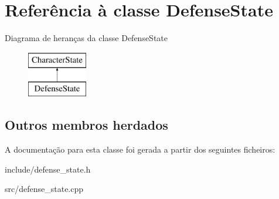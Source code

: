 \hypertarget{classDefenseState}{}\section{Referência à classe Defense\+State}
\label{classDefenseState}
Diagrama de heranças da classe Defense\+State\begin{figure}[H]
\begin{center}
\leavevmode
\includegraphics[height=2.000000cm]{classDefenseState}
\end{center}
\end{figure}
\subsection*{Outros membros herdados}


A documentação para esta classe foi gerada a partir dos seguintes ficheiros\+:\begin{DoxyCompactItemize}
\item 
include/defense\+\_\+state.\+h\item 
src/defense\+\_\+state.\+cpp\end{DoxyCompactItemize}
